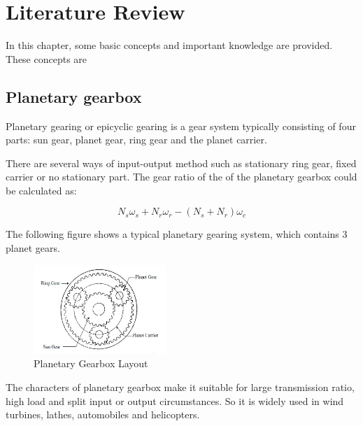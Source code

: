\chapter{Literature Review}\label{ch:literature}

In this chapter, some basic concepts and important knowledge are provided. These concepts are 

\section{Planetary gearbox}

Planetary gearing or epicyclic gearing is a gear system typically consisting of four parts: sun gear, planet gear, ring gear and the planet carrier.

There are several ways of input-output method such as stationary ring gear, fixed carrier or no stationary part. The gear ratio of the of the planetary gearbox could be calculated as:

\begin{equation}
	N_s\omega_s + N_r\omega_r - (N_s + N_r)\omega_c
\end{equation}

The following figure shows a typical planetary gearing system, which contains 3 planet gears.

\begin{figure}[h]
	\centering
	\includegraphics[width=5cm]{PGB}
	\caption{Planetary Gearbox Layout ~\cite{forrester}}
	\label{simulationfigure}
\end{figure}


The characters of planetary gearbox make it suitable for large transmission ratio, high load and split input or output circumstances. So it is widely used in wind turbines, lathes, automobiles and helicopters. 

















